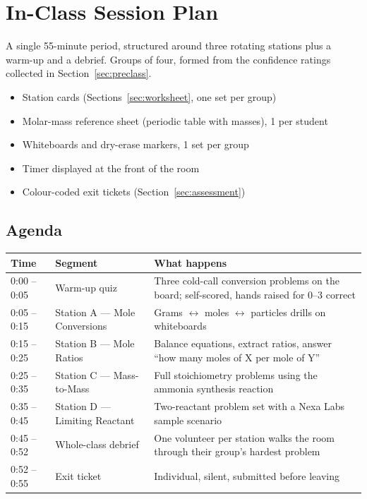 \section{In-Class Session Plan}
\label{sec:inclass}

A single 55-minute period, structured around three rotating stations plus
a warm-up and a debrief. Groups of four, formed from the confidence
ratings collected in Section~\ref{sec:preclass}.

\begin{materialsbox}
\begin{itemize}[label=\textbullet]
  \item Station cards (Sections~\ref{sec:worksheet}, one set per group)
  \item Molar-mass reference sheet (periodic table with masses), 1 per student
  \item Whiteboards and dry-erase markers, 1 set per group
  \item Timer displayed at the front of the room
  \item Colour-coded exit tickets (Section~\ref{sec:assessment})
\end{itemize}
\end{materialsbox}

\subsection*{Agenda}

\begin{table}[H]
\centering
\small
\begin{tabularx}{\textwidth}{@{}l l X@{}}
\toprule
\textbf{Time} & \textbf{Segment} & \textbf{What happens} \\
\midrule
0:00 -- 0:05 & Warm-up quiz & Three cold-call conversion problems on the board; self-scored, hands raised for 0--3 correct \\
0:05 -- 0:15 & Station A --- Mole Conversions & Grams $\leftrightarrow$ moles $\leftrightarrow$ particles drills on whiteboards \\
0:15 -- 0:25 & Station B --- Mole Ratios & Balance equations, extract ratios, answer ``how many moles of X per mole of Y'' \\
0:25 -- 0:35 & Station C --- Mass-to-Mass & Full stoichiometry problems using the ammonia synthesis reaction \\
0:35 -- 0:45 & Station D --- Limiting Reactant & Two-reactant problem set with a Nexa Labs sample scenario \\
0:45 -- 0:52 & Whole-class debrief & One volunteer per station walks the room through their group's hardest problem \\
0:52 -- 0:55 & Exit ticket & Individual, silent, submitted before leaving \\
\bottomrule
\end{tabularx}
\end{table}

